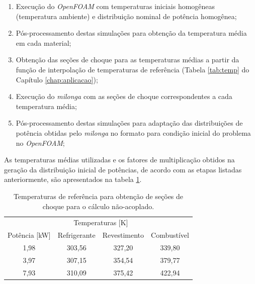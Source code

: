 \begin{enumerate}
\item Execução do \textit{OpenFOAM} com temperaturas iniciais homogêneas (temperatura ambiente) e distribuição nominal de potência homogênea;
\item Pós-processamento destas simulações para obtenção da temperatura média em cada material; %
\item Obtenção das seções de choque para as temperaturas médias a partir da função de interpolação de temperaturas
  de referência (Tabela \ref{tab:temp} do Capítulo \ref{chap:aplicacao});
\item Execução do \textit{milonga} com as seções de choque correspondentes a cada temperatura média;
\item Pós-processamento destas simulações para adaptação das distribuições de potência obtidas pelo \textit{milonga}
  no formato para condição inicial do problema no \textit{OpenFOAM};
\end{enumerate}

As temperaturas médias utilizadas e os fatores de multiplicação obtidos na geração da distribuição inicial
de potências, de acordo com as etapas listadas anteriormente, são apresentados na tabela \ref{tab:temp-keff}.

\begin{table}[htb]
  \centering
\caption{Temperaturas de referência para obtenção de seções de choque para o cálculo não-acoplado.}
\label{tab:temp-keff}
\begin{tabular}{cccc}
\multicolumn{1}{l}{}         & \multicolumn{2}{c}{Temperaturas [K]}                                                                      & \multicolumn{1}{l}{}     \\ \cline{2-4}
\multicolumn{1}{c}{Potência [kW]} & \multicolumn{1}{c}{Refrigerante} & \multicolumn{1}{c}{Revestimento} & \multicolumn{1}{c}{Combustível}  \\ \hline
1,98                      & 303,56                         & 327,20                         & 339,80                                         \\ \hline
3,97                      & 307,15                         & 354,54                         & 379,77                                          \\ \hline
7,93                      & 310,09                         & 375,42                         & 422,94                                         
\end{tabular}
\end{table}

